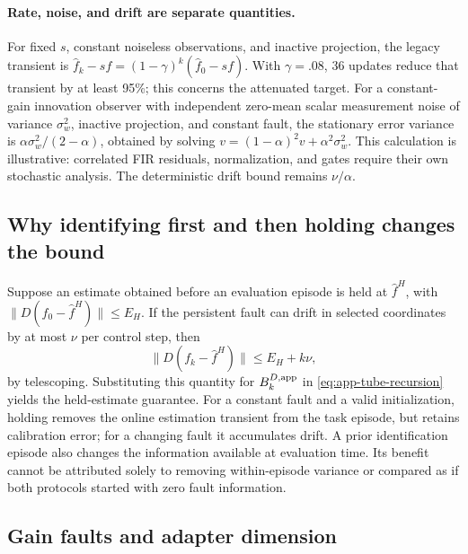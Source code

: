 \paragraph{Rate, noise, and drift are separate quantities.}
For fixed $s$, constant noiseless observations, and inactive projection,
the legacy transient is
$\widehat f_k-sf=(1-\gamma)^k(\widehat f_0-sf)$.
With $\gamma=.08$, 36 updates reduce that transient by at least 95\%;
this concerns the attenuated target. For a constant-gain innovation observer
with independent zero-mean scalar measurement noise of variance $\sigma_w^2$,
inactive projection, and constant fault, the stationary error variance is
$\alpha\sigma_w^2/(2-\alpha)$, obtained by solving
$v=(1-\alpha)^2v+\alpha^2\sigma_w^2$. This calculation is illustrative:
correlated FIR residuals, normalization, and gates require their own
stochastic analysis. The deterministic drift bound remains $\nu/\alpha$.

\subsection{Why identifying first and then holding changes the bound}

Suppose an estimate obtained before an evaluation episode is held at
$\widehat f^H$, with $\|D(f_0-\widehat f^H)\|\le E_H$. If the persistent
fault can drift in selected coordinates by at most $\nu$ per control step, then
\begin{equation}
 \|D(f_k-\widehat f^H)\|\le E_H+k\nu,
 \label{eq:app-held}
\end{equation}
by telescoping. Substituting this quantity for $B_k^{D,\rm app}$ in
\eqref{eq:app-tube-recursion} yields the held-estimate guarantee. For a constant
fault and a valid initialization, holding removes the online estimation
transient from the task episode, but retains calibration error; for a changing
fault it accumulates drift. A prior identification episode also changes the
information available at evaluation time. Its benefit cannot be attributed
solely to removing within-episode variance or compared as if both protocols
started with zero fault information.

\subsection{Gain faults and adapter dimension}
\label{app:gain-authority}

